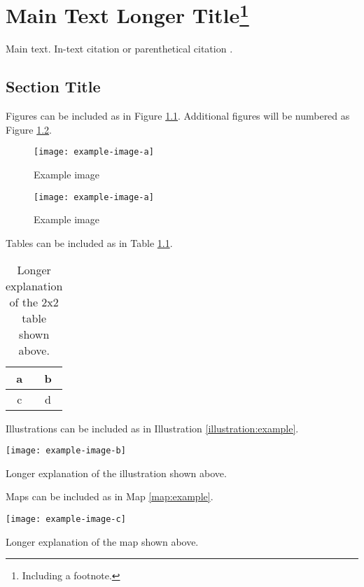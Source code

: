 \chapter[Main Text Short Title]{Main Text Longer Title\footnote{Including a footnote.}}
\label{main}
Main text. In-text citation \citet{knuth:tb} or parenthetical citation \citep{knuth:tb}.

\section{Section Title}
Figures can be included as in Figure \ref{fig:example}. Additional figures will be numbered as Figure \ref{fig:example2}.
\begin{figure}[h]
    \centering
    \texttt{[image: example-image-a]}
    \caption{Example image}
    \label{fig:example}
\end{figure}
\begin{figure}[ht]
    \centering
    \texttt{[image: example-image-a]}
    \caption{Example image}
    \label{fig:example2}
\end{figure}

Tables can be included as in Table \ref{tab:example}.
\begin{table}[t]
    \centering
    \begin{tabular}{cc}
        \toprule
         a & b \\\midrule
         c & d\\\bottomrule
    \end{tabular}
    \caption[Short example table title]{Longer explanation of the 2x2 table shown above.}
    \label{tab:example}
\end{table}

Illustrations can be included as in Illustration \ref{illustration:example}.
\begin{illustration}[H]
    \centering
    \texttt{[image: example-image-b]}
    \caption[Short example illustration title]{Longer explanation of the illustration shown above.}
    \label{illustration:example}
\end{illustration}

Maps can be included as in Map \ref{map:example}.
\begin{map}[H]
    \centering
    \texttt{[image: example-image-c]}
    \caption[Short example map title]{Longer explanation of the map shown above.}
    \label{map:example}
\end{map}

